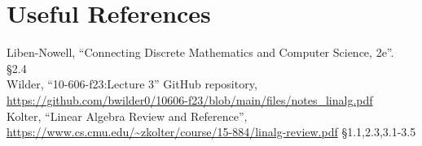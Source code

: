 \section*{Useful References}
Liben-Nowell, ``Connecting Discrete Mathematics and Computer Science, 2e''. \S 2.4\\
Wilder, ``10-606-f23:Lecture 3'' GitHub repository, \url{https://github.com/bwilder0/10606-f23/blob/main/files/notes_linalg.pdf}\\
Kolter, ``Linear Algebra Review and Reference'', \url{https://www.cs.cmu.edu/~zkolter/course/15-884/linalg-review.pdf} \S1.1,2.3,3.1-3.5

